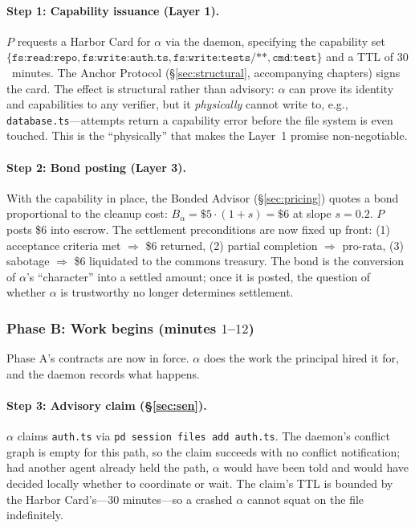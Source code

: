 \documentclass[11pt,a4paper]{article}
\theoremstyle{definition}
\theoremstyle{remark}
\begin{document}
\paragraph{Step 1: Capability issuance (Layer 1).} $P$ requests a Harbor Card for $\alpha$ via the daemon, specifying the capability set $\{\texttt{fs:read:repo}, \texttt{fs:write:auth.ts}, \texttt{fs:write:tests/**}, \texttt{cmd:test}\}$ and a TTL of $30$~minutes. The Anchor Protocol (\S\ref{sec:structural}, accompanying chapters) signs the card. The effect is structural rather than advisory: $\alpha$ can prove its identity and capabilities to any verifier, but it \emph{physically} cannot write to, e.g., \texttt{database.ts}---attempts return a capability error before the file system is even touched. This is the ``physically'' that makes the Layer~1 promise non-negotiable.

\paragraph{Step 2: Bond posting (Layer 3).} With the capability in place, the Bonded Advisor (\S\ref{sec:pricing}) quotes a bond proportional to the cleanup cost: $B_\alpha = \$5 \cdot (1 + s) = \$6$ at slope $s = 0.2$. $P$ posts \$6 into escrow. The settlement preconditions are now fixed up front: (1) acceptance criteria met $\Rightarrow$ \$6 returned, (2) partial completion $\Rightarrow$ pro-rata, (3) sabotage $\Rightarrow$ \$6 liquidated to the commons treasury. The bond is the conversion of $\alpha$'s ``character'' into a settled amount; once it is posted, the question of whether $\alpha$ is trustworthy no longer determines settlement.

\subsubsection*{Phase B: Work begins (minutes $1$--$12$)}

Phase A's contracts are now in force. $\alpha$ does the work the principal hired it for, and the daemon records what happens.

\paragraph{Step 3: Advisory claim (\S\ref{sec:sen}).} $\alpha$ claims \texttt{auth.ts} via \texttt{pd session files add auth.ts}. The daemon's conflict graph is empty for this path, so the claim succeeds with no conflict notification; had another agent already held the path, $\alpha$ would have been told and would have decided locally whether to coordinate or wait. The claim's TTL is bounded by the Harbor Card's---$30$ minutes---so a crashed $\alpha$ cannot squat on the file indefinitely.
\end{document}
